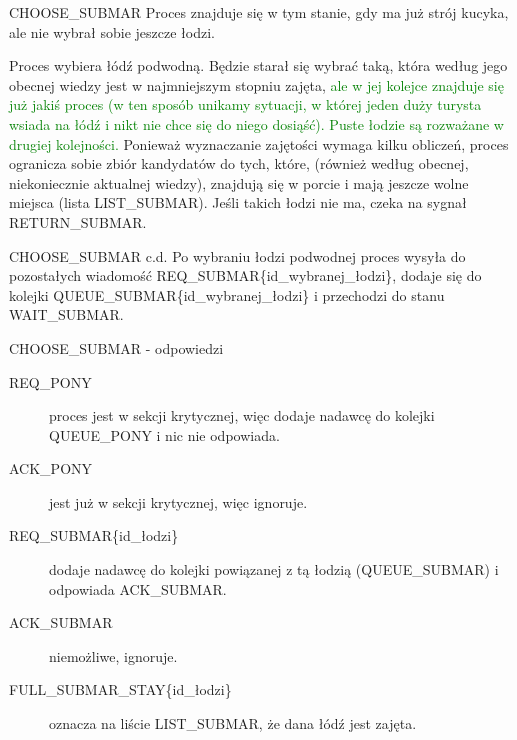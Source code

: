 \documentclass{beamer}
\begin{document}
\begin{frame}{CHOOSE\_SUBMAR}
    \internallinenumbers
    \resetlinenumber[1]
    Proces znajduje się w tym stanie, gdy ma już strój kucyka, ale nie wybrał sobie jeszcze łodzi.

    \vspace{0.4cm}
    Proces wybiera łódź podwodną. Będzie starał się wybrać taką, która według jego obecnej wiedzy jest w najmniejszym stopniu zajęta, \textcolor{green}{ale w jej kolejce znajduje się już jakiś proces (w ten sposób unikamy sytuacji, w której jeden duży turysta wsiada na łódź i nikt nie chce się do niego dosiąść). Puste łodzie są rozważane w drugiej kolejności.} Ponieważ wyznaczanie zajętości wymaga kilku obliczeń, proces ogranicza sobie zbiór kandydatów do tych, które, (również według obecnej, niekoniecznie aktualnej wiedzy), znajdują się w porcie i mają jeszcze wolne miejsca (lista LIST\_SUBMAR). Jeśli takich łodzi nie ma, czeka na sygnał RETURN\_SUBMAR.
\end{frame}

\begin{frame}{CHOOSE\_SUBMAR c.d.}
    \internallinenumbers
    \resetlinenumber[1]
    Po wybraniu łodzi podwodnej proces wysyła do pozostałych wiadomość REQ\_SUBMAR\{id\_wybranej\_łodzi\}, dodaje się do kolejki QUEUE\_SUBMAR\{id\_wybranej\_łodzi\} i przechodzi do stanu WAIT\_SUBMAR.
\end{frame}

\begin{frame}{CHOOSE\_SUBMAR - odpowiedzi}
    \internallinenumbers
    \resetlinenumber[1]
    \begin{description}
        \item [REQ\_PONY] proces jest w sekcji krytycznej, więc dodaje nadawcę do kolejki QUEUE\_PONY i nic nie odpowiada. 
        \item [ACK\_PONY] jest już w sekcji krytycznej, więc ignoruje.
        \item [REQ\_SUBMAR\{id\_łodzi\}] dodaje nadawcę do kolejki powiązanej z tą łodzią (QUEUE\_SUBMAR) i odpowiada ACK\_SUBMAR.
        \item [ACK\_SUBMAR] niemożliwe, ignoruje.
        \item [FULL\_SUBMAR\_STAY\{id\_łodzi\}] oznacza na liście LIST\_SUBMAR, że dana łódź jest zajęta.

    \end{description}
\end{frame}
\end{document}

